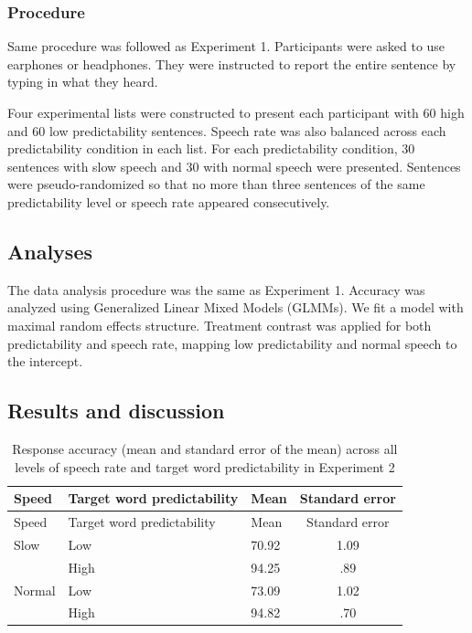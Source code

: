 \documentclass[a4paper, nobind]{templates/ociamthesis}
\begin{document}
\hypertarget{procedure-4}{%
\subsubsection{Procedure}\label{procedure-4}}

Same procedure was followed as Experiment 1.
Participants were asked to use earphones or headphones.
They were instructed to report the entire sentence by typing in what they heard.

Four experimental lists were constructed to present each participant with 60 high and 60 low predictability sentences.
Speech rate was also balanced across each predictability condition in each list. For each predictability condition, 30 sentences with slow speech and 30 with normal speech were presented.
Sentences were pseudo-randomized so that no more than three sentences of the same predictability level or speech rate appeared consecutively.

\hypertarget{analyses-4}{%
\subsection{Analyses}\label{analyses-4}}

The data analysis procedure was the same as Experiment 1.
Accuracy was analyzed using Generalized Linear Mixed Models (GLMMs).
We fit a model with maximal random effects structure.
Treatment contrast was applied for both predictability and speech rate, mapping low predictability and normal speech to the intercept.

\hypertarget{results-and-discussion-4}{%
\subsection{Results and discussion}\label{results-and-discussion-4}}

\begin{longtable}[]{@{}lllc@{}}
\caption{Response accuracy (mean and standard error of the mean) across all levels of speech rate and target word predictability in Experiment 2}
\label{summary3b}
\tabularnewline
\toprule
Speed & Target word predictability & Mean & Standard
error \\
\midrule
\endfirsthead
\toprule
Speed & Target word predictability & Mean & Standard
error \\
\midrule
\endhead
Slow & Low & 70.92 & 1.09 \\
& High & 94.25 & .89 \\
Normal & Low & 73.09 & 1.02 \\
& High & 94.82 & .70 \\
\bottomrule
\end{longtable}
\end{document}
